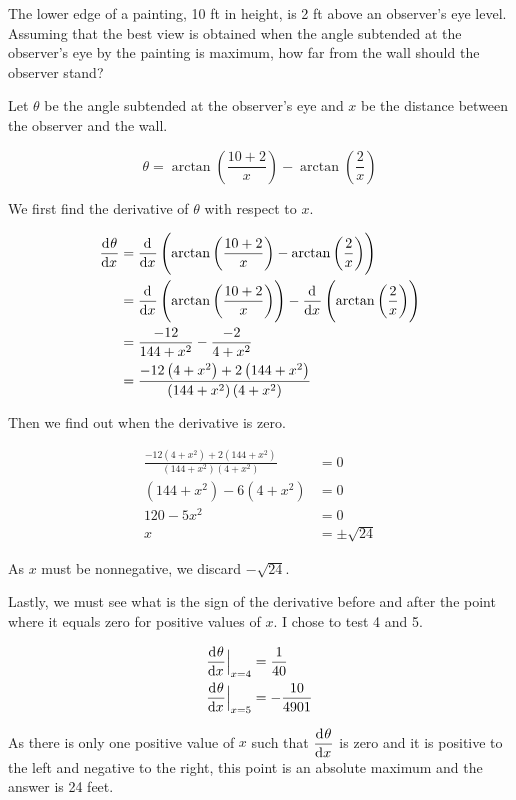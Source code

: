 \documentclass[a4paper, titlepage]{article}
\begin{document}
\begin{Exercise}
The lower edge of a painting, 10 ft in height, is 2 ft above
an observer’s eye level. Assuming that the best view is obtained
when the angle subtended at the observer's eye by the painting
is maximum, how far from the wall should the observer stand?
\cite{anton-bivens-davis}
\end{Exercise}

\begin{Answer}

Let \(\theta\) be the angle subtended at the observer's eye
and \(x\) be the distance between the observer and the wall.

\[\theta = \arctan \left( \frac{10 + 2}{x} \right) - \arctan \left( \frac{2}{x} \right)\]

We first find the derivative of \(\theta\) with respect to \(x\).

\begin{align*}
  \dod{\theta}{x} &= \dod{}{x} \left( \arctan \left( \frac{10 + 2}{x} \right) - \arctan \left( \frac{2}{x} \right) \right) \\
   &= \dod{}{x} \left( \arctan \left( \frac{10 + 2}{x} \right) \right)
    - \dod{}{x} \left( \arctan \left( \frac{2}{x} \right) \right) \\
   &= \frac{-12}{144 + x^2} - \frac{-2}{4 + x^2} \\
   &= \frac{-12 \left( 4 + x^2 \right) + 2 \left( 144 + x^2 \right)}
           {\left( 144 + x^2 \right) \left( 4 + x^2 \right)} \\
\end{align*}

Then we find out when the derivative is zero.

\begin{align*}
  \frac{-12 \left( 4 + x^2 \right) + 2 \left( 144 + x^2 \right)}
       {\left( 144 + x^2 \right) \left( 4 + x^2 \right)} &= 0 \\
  \left( 144 + x^2 \right) - 6 \left( 4 + x^2 \right) &= 0 \\
  120 - 5 x^2 &= 0 \\
  x &= \pm \sqrt{24}
\end{align*}

As \(x\) must be nonnegative, we discard \(- \sqrt{24}\).

Lastly, we must see what is the sign of the derivative before and after the point where it
equals zero for positive values of \(x\). I chose to test 4 and 5.

\begin{align*}
  \dod{\theta}{x}\Bigr|_{\substack{\\x = 4}} &= \frac{1}{40} \\
  \dod{\theta}{x}\Bigr|_{\substack{\\x = 5}} &= - \frac{10}{4901}
\end{align*}

As there is only one positive value of \(x\) such that \(\dod{\theta}{x}\) is zero
and it is positive to the left and negative to the right, this point is an absolute maximum
and the answer is 24 feet.
    
\end{Answer}
\end{document}
